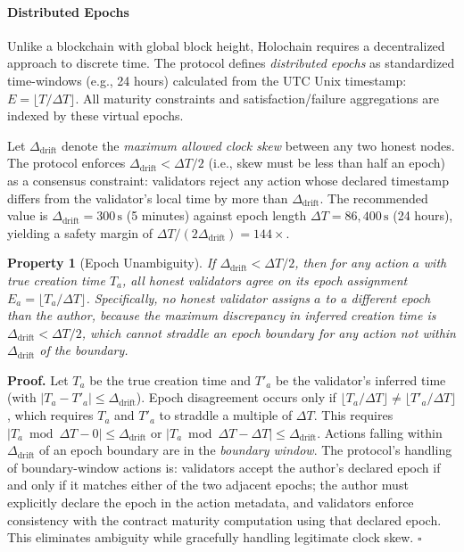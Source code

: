 \documentclass[11pt]{article}
\newtheorem{property}{Property}[section]
\newcommand{\qed}{\hfill}
\newenvironment{proof}{\noindent\textbf{Proof.}}{\qed$\square$\par\medskip}
\begin{document}
\paragraph{Distributed Epochs}
Unlike a blockchain with global block height, Holochain requires a decentralized approach to discrete time. The protocol defines \emph{distributed epochs} as standardized time-windows (e.g., 24 hours) calculated from the UTC Unix timestamp: $E = \lfloor T / \Delta T \rfloor$. All maturity constraints and satisfaction/failure aggregations are indexed by these virtual epochs.

Let $\Delta_{\text{drift}}$ denote the \emph{maximum allowed clock skew} between any two honest nodes. The protocol enforces $\Delta_{\text{drift}} < \Delta T / 2$ (i.e., skew must be less than half an epoch) as a consensus constraint: validators reject any action whose declared timestamp differs from the validator's local time by more than $\Delta_{\text{drift}}$. The recommended value is $\Delta_{\text{drift}} = 300\,\text{s}$ (5 minutes) against epoch length $\Delta T = 86{,}400\,\text{s}$ (24 hours), yielding a safety margin of $\Delta T / (2\Delta_{\text{drift}}) = 144\times$.

\begin{property}[Epoch Unambiguity]\label{prop:epoch}
If $\Delta_{\text{drift}} < \Delta T / 2$, then for any action $a$ with true creation time $T_a$, all honest validators agree on its epoch assignment $E_a = \lfloor T_a / \Delta T \rfloor$. Specifically, no honest validator assigns $a$ to a different epoch than the author, because the maximum discrepancy in inferred creation time is $\Delta_{\text{drift}} < \Delta T / 2$, which cannot straddle an epoch boundary for any action not within $\Delta_{\text{drift}}$ of the boundary.
\end{property}

\begin{proof}
Let $T_a$ be the true creation time and $T'_a$ be the validator's inferred time (with $|T_a - T'_a| \leq \Delta_{\text{drift}}$). Epoch disagreement occurs only if $\lfloor T_a / \Delta T \rfloor \neq \lfloor T'_a / \Delta T \rfloor$, which requires $T_a$ and $T'_a$ to straddle a multiple of $\Delta T$. This requires $|T_a \bmod \Delta T - 0| \leq \Delta_{\text{drift}}$ or $|T_a \bmod \Delta T - \Delta T| \leq \Delta_{\text{drift}}$. Actions falling within $\Delta_{\text{drift}}$ of an epoch boundary are in the \emph{boundary window}. The protocol's handling of boundary-window actions is: validators accept the author's declared epoch if and only if it matches either of the two adjacent epochs; the author must explicitly declare the epoch in the action metadata, and validators enforce consistency with the contract maturity computation using that declared epoch. This eliminates ambiguity while gracefully handling legitimate clock skew. \qed
\end{proof}
\end{document}
